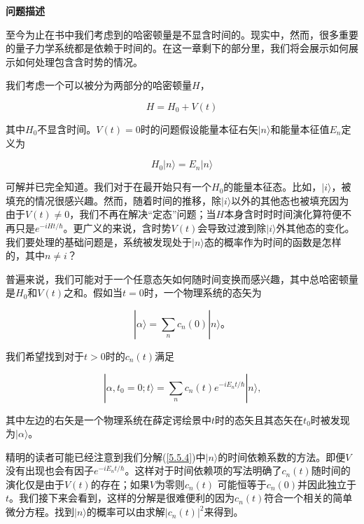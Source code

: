 ﻿\documentclass[UTF8,twoside]{ctexart}
\begin{document}
\noindent \textbf{问题描述}

\noindent 至今为止在书中我们考虑到的哈密顿量是不显含时间的。现实中，然而，很多重要的量子力学系统都是依赖于时间的。在这一章剩下的部分里，我们将会展示如何展示如何处理包含含时势的情况。

我们考虑一个可以被分为两部分的哈密顿量$H$，

\begin{equation} \label{5.5.1}
H=H_0+V(t)
\end{equation}

\noindent 其中$H_0$不显含时间。$V(t)=0$时的问题假设能量本征右矢$|n\rangle$和能量本征值$E_n$定义为

\begin{equation} \label{5.5.2}
H_0|n\rangle=E_n|n\rangle
\end{equation}

\noindent 可解并已完全知道。我们对于在最开始只有一个$H_0$的能量本征态。比如，$|i\rangle$，被填充的情况很感兴趣。然而，随着时间的推移，除$|i\rangle$以外的其他态也被填充因为由于$V(t)\neq0$，我们不再在解决“定态”问题；当$H$本身含时时时间演化算符便不再只是$e^{-iHt/\hbar}$。更广义的来说，含时势$V(t)$会导致过渡到除$|i\rangle$外其他态的变化。我们要处理的基础问题是，系统被发现处于$|n\rangle$态的概率作为时间的函数是怎样的，其中$n\neq i$？

普遍来说，我们可能对于一个任意态矢如何随时间变换而感兴趣，其中总哈密顿量是$H_0$和$V(t)$之和。假如当$t=0$时，一个物理系统的态矢为

\begin{equation} \label{5.5.3}
|\alpha\rangle=\displaystyle\sum_n c_n(0)|n\rangle\text{。}
\end{equation}

\noindent 我们希望找到对于$t>0$时的$c_n(t)$满足

\begin{equation} \label{5.5.4}
|\alpha,t_0=0;t\rangle=\displaystyle\sum_n c_n(t)e^{-iE_n t/\hbar}|n\rangle\text{,}
\end{equation}

\noindent 其中左边的右矢是一个物理系统在薛定谔绘景中$t$时的态矢且其态矢在$t_0$时被发现为$|\alpha\rangle$。

精明的读者可能已经注意到我们分解(\ref{5.5.4})中$|n\rangle$的时间依赖系数的方法。即便$V$没有出现也会有因子$e^{-iE_n t/\hbar}$。这样对于时间依赖项的写法明确了$c_n(t)$随时间的演化仅是由于$V(t)$的存在；如果$V$为零则$c_n(t)$ 可能恒等于$c_n(0)$并因此独立于$t$。我们接下来会看到，这样的分解是很难便利的因为$c_n(t)$符合一个相关的简单微分方程。找到$|n\rangle$的概率可以由求解$|c_n(t)|^2$来得到。
\end{document}
